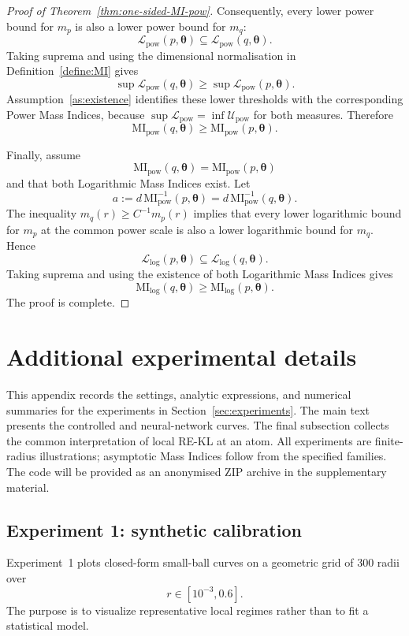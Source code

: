 \documentclass[11pt,a4paper]{article}
\newcommand{\MI}{\mathrm{MI}}
\newcommand{\pa}{\boldsymbol\theta}
\theoremstyle{compactplain}
\theoremstyle{compactdefinition}
\numberwithin{equation}{section}
\begin{document}
\begin{proof}[Proof of Theorem~\ref{thm:one-sided-MI-pow}]
Consequently, every lower power bound for \(m_p\) is also a lower power bound
for \(m_q\):
\[
 \mathcal L_{\mathrm{pow}}(p,\pa)
 \subseteq
 \mathcal L_{\mathrm{pow}}(q,\pa).
\]
Taking suprema and using the dimensional normalisation in Definition~\ref{define:MI} gives
\[
 \sup\mathcal L_{\mathrm{pow}}(q,\pa)
 \ge
 \sup\mathcal L_{\mathrm{pow}}(p,\pa).
\]
Assumption~\ref{as:existence} identifies these lower thresholds with the corresponding Power Mass
Indices, because \(\sup\mathcal L_{\mathrm{pow}}=\inf\mathcal U_{\mathrm{pow}}\)
for both measures. Therefore
\[
 \MI_{\mathrm{pow}}(q,\pa)
 \ge
 \MI_{\mathrm{pow}}(p,\pa).
\]

Finally, assume
\[
 \MI_{\mathrm{pow}}(q,\pa)=\MI_{\mathrm{pow}}(p,\pa)
\]
and that both Logarithmic Mass Indices exist. Let
\[
 a:=d\,\MI_{\mathrm{pow}}^{-1}(p,\pa)
 =d\,\MI_{\mathrm{pow}}^{-1}(q,\pa).
\]
The inequality \(m_q(r)\ge C^{-1}m_p(r)\) implies that every lower logarithmic
bound for \(m_p\) at the common power scale is also a lower logarithmic bound
for \(m_q\). Hence
\[
 \mathcal L_{\mathrm{log}}(p,\pa)
 \subseteq
 \mathcal L_{\mathrm{log}}(q,\pa).
\]
Taking suprema and using the existence of both Logarithmic Mass Indices gives
\[
 \MI_{\mathrm{log}}(q,\pa)
 \ge
 \MI_{\mathrm{log}}(p,\pa).
\]
The proof is complete.
\end{proof}


\section{Additional experimental details}
\label{app:experiment_details}

This appendix records the settings, analytic expressions, and numerical summaries for the experiments in Section~\ref{sec:experiments}. The main text presents the controlled and neural-network curves. The final subsection collects the common interpretation of local RE-KL at an atom. All experiments are finite-radius illustrations; asymptotic Mass Indices follow from the specified families. The code will be provided as an anonymised ZIP archive in the supplementary material.

\subsection{Experiment 1: synthetic calibration}
\label{app:synthetic_calibration}

Experiment~1 plots closed-form small-ball curves on a geometric grid of 300 radii over
\[
r\in[10^{-3},0.6].
\]
The purpose is to visualize representative local regimes rather than to fit a statistical model.
\end{document}
